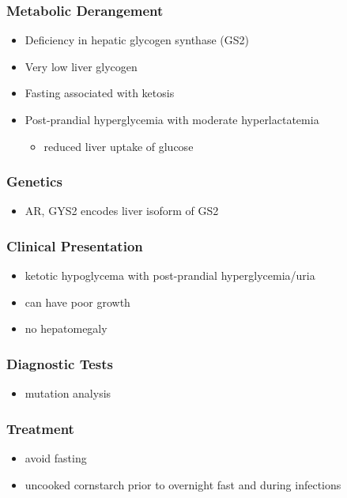 \documentclass{scrartcl}
\begin{document}
\subsubsection{Metabolic Derangement}
\label{sec:org9d41eeb}
\begin{itemize}
\item Deficiency in hepatic glycogen synthase (GS2)
\item Very low liver glycogen
\item Fasting associated with ketosis
\item Post-prandial hyperglycemia with moderate hyperlactatemia
\begin{itemize}
\item reduced liver uptake of glucose
\end{itemize}
\end{itemize}

\subsubsection{Genetics}
\label{sec:org4b9e226}
\begin{itemize}
\item AR, GYS2 encodes liver isoform of GS2
\end{itemize}

\subsubsection{Clinical Presentation}
\label{sec:orgeeb3615}
\begin{itemize}
\item ketotic hypoglycema with post-prandial hyperglycemia/uria
\item can have poor growth
\item no hepatomegaly
\end{itemize}

\subsubsection{Diagnostic Tests}
\label{sec:org6b4b876}
\begin{itemize}
\item mutation analysis
\end{itemize}
\subsubsection{Treatment}
\label{sec:org04b3437}
\begin{itemize}
\item avoid fasting
\item uncooked cornstarch prior to overnight fast and during infections
\end{itemize}
\end{document}
